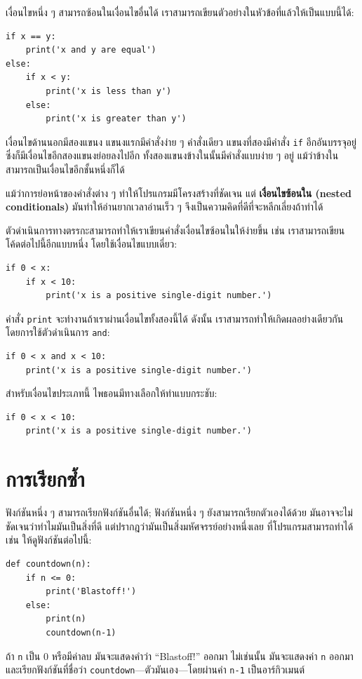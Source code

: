 เงื่อนไขหนึ่ง ๆ สามารถซ้อนในเงื่อนไขอื่นได้ เราสามารถเขียนตัวอย่างในหัวข้อที่แล้วให้เป็นแบบนี้ได้:

\begin{verbatim}
if x == y:
    print('x and y are equal')
else:
    if x < y:
        print('x is less than y')
    else:
        print('x is greater than y')
\end{verbatim}
%
เงื่อนไขด้านนอกมีสองแขนง แขนงแรกมีคำสั่งง่าย ๆ คำสั่งเดียว
แขนงที่สองมีคำสั่ง {\tt if} อีกอันบรรจุอยู่ ซึ่งก็มีเงื่อนไขอีกสองแขนงย่อยลงไปอีก 
ทั้งสองแขนงข้างในนั้นมีคำสั่งแบบง่าย ๆ อยู่ แม้ว่าข้างในสามารถเป็นเงื่อนไขอีกชั้นหนึ่งก็ได้

แม้ว่าการย่อหน้าของคำสั่งต่าง ๆ ทำให้โปรแกรมมีโครงสร้างที่ชัดเจน  แต่ {\bf เงื่อนไขซ้อนใน 
(nested conditionals)} มันทำให้อ่านยากเวลาอ่านเร็ว ๆ จึงเป็นความคิดที่ดีที่จะหลีกเลี่ยงถ้าทำได้

ตัวดำเนินการทางตรรกะสามารถทำให้เราเขียนคำสั่งเงื่อนไขซ้อนในให้ง่ายขึ้น เช่น เราสามารถเขียน
โค้ดต่อไปนี้อีกแบบหนึ่ง โดยใช้เงื่อนไขแบบเดี่ยว:

\begin{verbatim}
if 0 < x:
    if x < 10:
        print('x is a positive single-digit number.')
\end{verbatim}
%
คำสั่ง {\tt print} จะทำงานถ้าเราผ่านเงื่อนไขทั้งสองนี้ได้ ดังนั้น เราสามารถทำให้เกิดผลอย่างเดียวกัน 
โดยการใช้ตัวดำเนินการ {\tt and}:

\begin{verbatim}
if 0 < x and x < 10:
    print('x is a positive single-digit number.')
\end{verbatim}

สำหรับเงื่อนไขประเภทนี้ ไพธอนมีทางเลือกให้ทำแบบกระชับ:

\begin{verbatim}
if 0 < x < 10:
    print('x is a positive single-digit number.')
\end{verbatim}


\section{การเรียกซ้ำ} %
\label{recursion}


ฟังก์ชันหนึ่ง ๆ สามารถเรียกฟังก์ชันอื่นได้; ฟังก์ชันหนึ่ง ๆ ยังสามารถเรียกตัวเองได้ด้วย
มันอาจจะไม่ชัดเจนว่าทำไมมันเป็นสิ่งที่ดี แต่ปรากฎว่ามันเป็นสิ่งมหัศจรรย์อย่างหนึ่งเลย
ที่โปรแกรมสามารถทำได้ เช่น ให้ดูฟังก์ชันต่อไปนี้:

\begin{verbatim}
def countdown(n):
    if n <= 0:
        print('Blastoff!')
    else:
        print(n)
        countdown(n-1)
\end{verbatim}
%
ถ้า {\tt n} เป็น 0 หรือมีค่าลบ มันจะแสดงคำว่า ``Blastoff!'' ออกมา
ไม่เช่นนั้น มันจะแสดงค่า {\tt n} ออกมาและเรียกฟังก์ชันที่ชื่อว่า {\tt countdown}---ตัวมันเอง---โดยผ่านค่า {\tt n-1} เป็นอาร์กิวเมนต์

